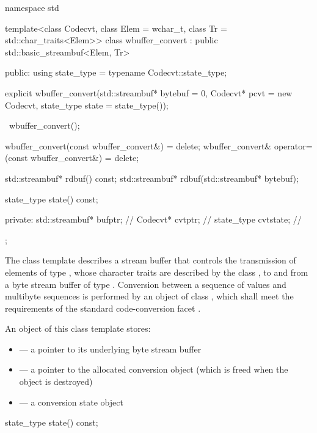 %
\begin{codeblock}
namespace std {
template<class Codecvt,
    class Elem = wchar_t,
    class Tr = std::char_traits<Elem>>
  class wbuffer_convert
    : public std::basic_streambuf<Elem, Tr> {
  public:
    using state_type = typename Codecvt::state_type;

    explicit wbuffer_convert(std::streambuf* bytebuf = 0,
                             Codecvt* pcvt = new Codecvt,
                             state_type state = state_type());

    ~wbuffer_convert();

    wbuffer_convert(const wbuffer_convert&) = delete;
    wbuffer_convert& operator=(const wbuffer_convert&) = delete;

    std::streambuf* rdbuf() const;
    std::streambuf* rdbuf(std::streambuf* bytebuf);

    state_type state() const;

  private:
    std::streambuf* bufptr;         // \expos
    Codecvt* cvtptr;                // \expos
    state_type cvtstate;            // \expos
  };
}
\end{codeblock}

\pnum
The class template describes a stream buffer that controls the
transmission of elements of type , whose character traits are
described by the class , to and from a byte stream buffer of type
. Conversion between a sequence of  values and
multibyte sequences is performed by an object of class
, which shall meet the requirements
of the standard code-conversion facet .

\pnum
An object of this class template stores:

\begin{itemize}
\item {} --- a pointer to its underlying byte stream buffer
\item {} --- a pointer to the allocated conversion object
(which is freed when the  object is destroyed)
\item {} --- a conversion state object
\end{itemize}

%
\begin{itemdecl}
state_type state() const;
\end{itemdecl}


